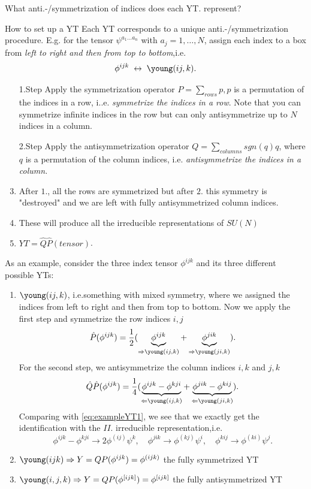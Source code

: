 What anti.-/symmetrization of indices does each YT. represent?\\
\begin{mybox}{How to set up a YT}
Each YT corresponds to a unique anti.-/symmetrization procedure. E.g. for the tensor $\psi^{a_1 \dots a_n}$ with $a_j=1,\dots,N$,
assign each index to a box from \emph{left to right and then from top to bottom},i.e.
\begin{equation}
	\phi^{ijk} \; \leftrightarrow \; 
\young(ij,k).
\end{equation}
\begin{enumerate}
	\item[1.Step] Apply the symmetrization operator $P=\sum_{rows} p,p$ is a permutation of the indices in a row, i..e. \emph{symmetrize the indices in a row}. Note that you can symmetrize infinite indices in the row but can only antisymmetrize up to $N$ indices in a column.
	\item[2.Step] Apply the antisymmetrization operator $Q=\sum_{columns} sgn(q) q$, where $q$ is a permutation of the column indices, i.e. \emph{antisymmetrize the indices in a column.}
\item After $1.$, all the rows are symmetrized but after $2.$ this symmetry is "destroyed" and we are left with fully antisymmetrized column indices.
\item These will produce all the irreducible representations of $SU(N)$
\item $YT=\hat{ Q} \hat{ P}(tensor)$.
\end{enumerate}
\end{mybox}
As an example, consider the three index tensor $\phi^{ijk}$ and its three different possible YTs:
\begin{enumerate}
	\item $\young(ij,k)$, i.e.something with mixed symmetry, where we assigned the indices from left to right and then from top to bottom. Now we apply the first step and symmetrize the row indices $i,j$
	\begin{equation}
		\hat{ P}(\phi^{ijk}) =\half (\underbrace{\phi^{ijk}}_{\Rightarrow \young(ij,k)} + \underbrace{\phi^{jik}}_{\Rightarrow \young(ji,k)}).
	\end{equation}
For the second step, we antisymmetrize the column indices $i,k$ and $j,k$
\begin{equation}
	\hat{ Q}\hat{ P}(\phi^{ijk}) = \frac{1}{4} (\underbrace{\phi^{ijk} - \phi^{kji} }_{\Leftarrow \young(ij,k)} + \underbrace{\phi^{jik} - \phi^{kij}}_{\Leftarrow \young(ji,k)}	).
	\end{equation}
	Comparing with \ref{eq:exampleYT1}, we see that we exactly get the identification with the $II.$ irreducible representation,i.e.
	\begin{equation}
	\phi^{ijk}-\phi^{kji} \rightarrow 2 \phi^{(ij)} \psi^k,\quad \phi^{jik} \rightarrow \phi^{(kj)} \psi^i,\quad \phi^{kij} \rightarrow \phi^{(ki)} \psi^j.
	\end{equation}
	\item $\young(ijk) \Rightarrow Y=QP(\phi^{ijk}) = \phi^{(ijk)}$ the fully symmetrized YT
	\item $\young(i,j,k) \Rightarrow Y=QP(\phi^{[ijk]})=\phi^{[ijk]}$ the fully antisymmetrized YT 
	\end{enumerate}
